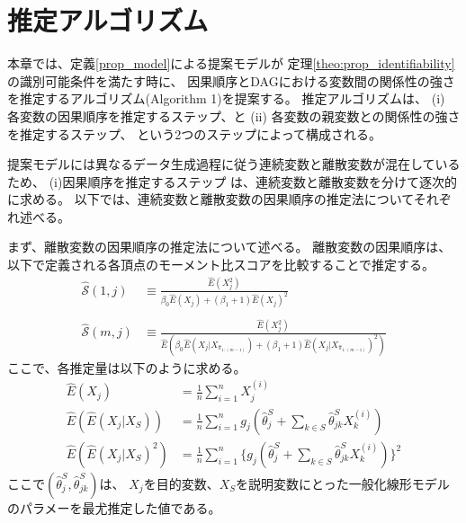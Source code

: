 
\section{推定アルゴリズム}
\label{part:algorithm}

本章では、定義\ref{prop_model}による提案モデルが
定理\ref{theo:prop_identifiability}の識別可能条件を満たす時に、
因果順序とDAGにおける変数間の関係性の強さを推定するアルゴリズム(Algorithm 1)を提案する。
推定アルゴリズムは、
(i) 各変数の因果順序を推定するステップ、と
(ii) 各変数の親変数との関係性の強さを推定するステップ、
という2つのステップによって構成される。

提案モデルには異なるデータ生成過程に従う連続変数と離散変数が混在しているため、
(i)因果順序を推定するステップ は、連続変数と離散変数を分けて逐次的に求める。
以下では、連続変数と離散変数の因果順序の推定法についてそれぞれ述べる。

まず、離散変数の因果順序の推定法について述べる。
離散変数の因果順序は、以下で定義される各頂点のモーメント比スコアを比較することで推定する。
\begin{equation}
  \begin{split}
    \widehat{\mathcal S}(1,j) &\equiv
          \frac{\widehat{E}(X_j^2)}{\beta_0 \widehat{E}(X_j) + (\beta_1 + 1)\widehat{E}(X_j)^2} \\
          \\
    \widehat{\mathcal S}(m,j) &\equiv
          \frac{\widehat{E}(X_j^2)}
          {\widehat{E}(\beta_0 \widehat{E}(X_j | X_{\widehat{\pi}_{1:(m-1)}}) +
          (\beta_1 + 1)\widehat{E}(X_j | X_{\widehat{\pi}_{1:(m-1)}})^2)}
  \end{split}
  \label{alg:MRS}
\end{equation}
ここで、各推定量は以下のように求める。
\begin{align*}
  \widehat{E}(X_j)
      &= \tfrac{1}{n}\textstyle \sum_{i=1}^n X_j^{(i)} \\
  \widehat{E}(\widehat{E}(X_j | X_S))
      &= \tfrac{1}{n}\textstyle \sum_{i=1}^n g_j(\widehat{\theta}_j^S +
         \textstyle \sum_{k\in S} \widehat{\theta}_{jk}^S X_k^{(i)}) \\
  \widehat{E}(\widehat{E}(X_j | X_S)^2)
      &= \tfrac{1}{n}\textstyle \sum_{i=1}^n \{g_j(\widehat{\theta}_j^S +
         \textstyle \sum_{k\in S} \widehat{\theta}_{jk}^S X_k^{(i)})\}^2
\end{align*}
ここで$(\widehat{\theta}_j^S, \widehat{\theta}_{jk}^S)$は、
$X_j$を目的変数、$X_S$を説明変数にとった一般化線形モデルのパラメーを最尤推定した値である。

